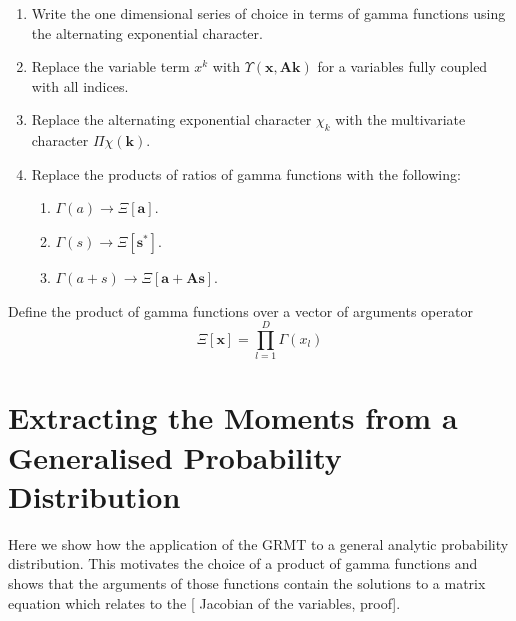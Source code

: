 \documentclass[journal=jcisd8,manuscript=article,layout=onecolumn,pdftex,floatfix,amsmath,amssymb,10pt]{achemso}
\begin{document}
\begin{enumerate}
\item Write the one dimensional series of choice in terms of gamma functions using the alternating exponential character.
\item Replace the variable term $x^k$ with $\Upsilon(\mathbf{x},\mathbf{A}\mathbf{k})$ for a variables fully coupled with all indices.
\item Replace the alternating exponential character $\chi_k$ with the multivariate character $\Pi\chi(\mathbf{k})$.
\item Replace the products of ratios of gamma functions with the following:
\begin{enumerate}
\item $\Gamma(a) \to \Xi[\mathbf{a}]$.
\item $\Gamma(s) \to \Xi[\mathbf{s}^*]$.
\item $\Gamma(a+s) \to \Xi[\mathbf{a}+\mathbf{A}\mathbf{s}]$.
\end{enumerate}
\end{enumerate}

Define the product of gamma functions over a vector of arguments operator
\begin{equation}
\Xi[\mathbf{x}] = \prod_{l=1}^D \Gamma(x_l)
\end{equation}


\section{Extracting the Moments from a Generalised Probability Distribution}
Here we show how the application of the GRMT to a general analytic probability distribution. This motivates the choice of a product of gamma functions and shows that the arguments of those functions contain the solutions to a matrix equation which relates to the [{\color{red} Jacobian of the variables}, proof].
\end{document}
